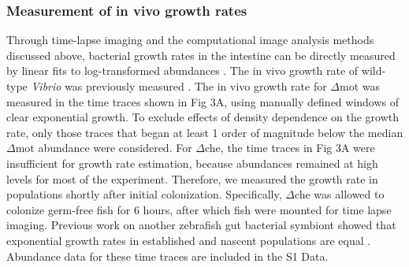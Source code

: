 {{{{{{{\subsubsection{Measurement of in vivo growth rates}
Through time-lapse imaging and the computational image analysis methods discussed above, bacterial growth rates in the intestine can be directly measured by linear fits to log-transformed abundances \cite{wiles_host_2016,schlomann_sublethal_2019,jemielita_spatial_2014}. The in vivo growth rate of wild-type \textit{Vibrio} was previously measured \cite{wiles_host_2016}. The in vivo growth rate for $\Delta$mot was measured in the time traces shown in Fig 3A, using manually defined windows of clear exponential growth. To exclude effects of density dependence on the growth rate, only those traces that began at least 1 order of magnitude below the median $\Delta$mot abundance were considered. For $\Delta$che, the time traces in Fig 3A were insufficient for growth rate estimation, because abundances remained at high levels for most of the experiment. Therefore, we measured the growth rate in populations shortly after initial colonization. Specifically, $\Delta$che was allowed to colonize germ-free fish for 6 hours, after which fish were mounted for time lapse imaging. Previous work on another zebrafish gut bacterial symbiont showed that exponential growth rates in established and nascent populations are equal \cite{wiles_host_2016}. Abundance data for these time traces are included in the S1 Data.

}}}}}}}
